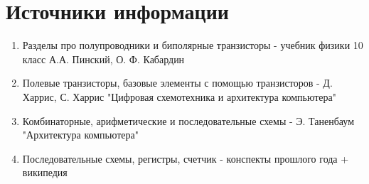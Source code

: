 \documentclass[12pt, a4paper]{article}
\begin{document}
\section{Источники информации}
\begin{enumerate}
    \item Разделы про полупроводники и биполярные транзисторы - учебник физики 10 класс А.А. Пинский, О. Ф. Кабардин
    \item Полевые транзисторы, базовые элементы с помощью транзисторов - Д. Харрис, С. Харрис "Цифровая схемотехника и архитектура компьютера"
    \item Комбинаторные, арифметические и последовательные схемы - Э. Таненбаум "Архитектура компьютера"
    \item Последовательные схемы, регистры, счетчик - конспекты прошлого года + википедия
\end{enumerate}
\end{document}
